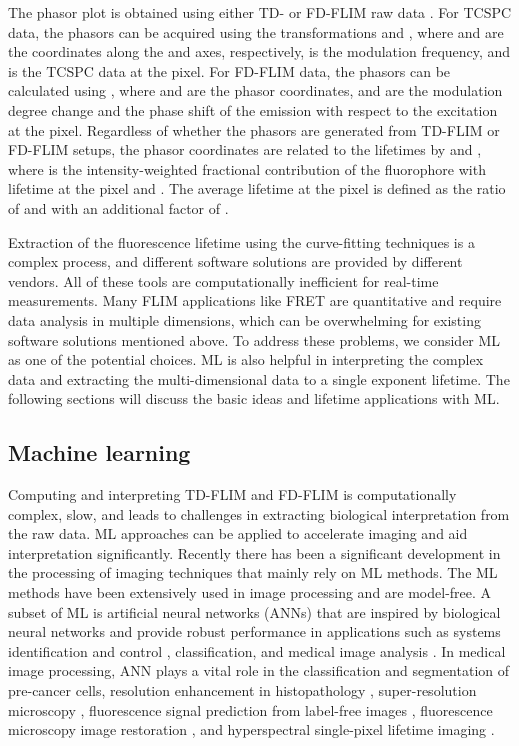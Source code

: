 \documentclass[12pt]{iopart}
\begin{document}
The phasor plot is obtained using either TD- or FD-FLIM raw data \cite{flim_phasors}. For TCSPC data, the phasors can be acquired using the transformations  and , where  and  are the coordinates along the  and  axes, respectively,  is the modulation frequency, and  is the TCSPC data at the  pixel. For FD-FLIM data, the phasors can be calculated using , where  and  are the phasor coordinates,  and  are the modulation degree change and the phase shift of the emission with respect to the excitation at the  pixel. Regardless of whether the phasors are generated from TD-FLIM or FD-FLIM setups, the phasor coordinates are related to the lifetimes by  and , where  is the intensity-weighted fractional contribution of the  fluorophore with lifetime  at the  pixel and  \cite{phasors}. The average lifetime at the  pixel is defined as the ratio of  and  with an additional factor of .

Extraction of the fluorescence lifetime using the curve-fitting techniques is a complex process, and different software solutions are provided by different vendors\cite{spcimage, symphotime64, EasyTau2, flimfast, vistavision, flimfit, clip, li-flim, decayfit, cellSens}. All of these tools are computationally inefficient for real-time measurements. Many FLIM applications like FRET are quantitative and require data analysis in multiple dimensions, which can be overwhelming for existing software solutions mentioned above. To address these problems, we consider ML as one of the potential choices. ML is also helpful in interpreting the complex data and extracting the multi-dimensional data to a single exponent lifetime. The following sections will discuss the basic ideas and lifetime applications with ML.

\subsection{Machine learning} \label{ml}
Computing and interpreting TD-FLIM and FD-FLIM is computationally complex, slow, and leads to challenges in extracting biological interpretation from the raw data. ML approaches can be applied to accelerate imaging and aid interpretation significantly. Recently there has been a significant development in the processing of imaging techniques that mainly rely on ML methods. The ML methods have been extensively used in image processing and are model-free. A subset of ML is artificial neural networks (ANNs) that are inspired by biological neural networks and provide robust performance in applications such as systems identification and control \cite{control_ann}, classification, and medical image analysis \cite{ann_medical}. In medical image processing, ANN plays a vital role in the classification and segmentation of pre-cancer cells, resolution enhancement in histopathology \cite{histopath_ann}, super-resolution microscopy \cite{sr_ann}, fluorescence signal prediction from label-free images \cite{label_free_ann}, fluorescence microscopy image restoration \cite{restoration_ann}, and hyperspectral single-pixel lifetime imaging \cite{netflics1}.
\end{document}
